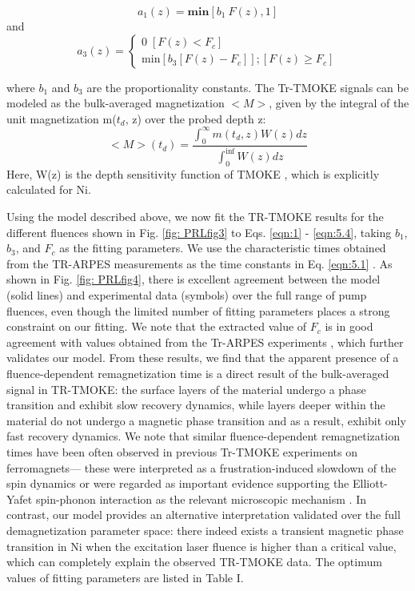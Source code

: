 \begin{equation}
a_1(z) = \textbf{min}[b_1 \: F(z),1]
\label{eqn:5.2}
\end{equation}
and
\begin{equation*}
a_3(z) = 
\begin{cases}
0 \; \left[F(z) < F_c\right]\\
\text{min} \left[ b_3 \left[ F(z)-F_c \right] \right]; \left[F(z) \geq F_c\right]
\end{cases}
\label{eqn:5.3}
\end{equation*}

where $b_1$ and $b_3$ are the proportionality constants. The Tr-TMOKE signals can be modeled as the bulk-averaged magnetization $<M>$, given by the integral of the unit magnetization m($t_d$, z) over the probed depth z:
\begin{equation}
<M>(t_d)=\frac{\int^{\infty}_0 m(t_d,z) W(z) dz}{\int^{\inf}_0 W(z) dz}
\label{eqn:4}
\end{equation}
Here, W(z) is the depth sensitivity function of TMOKE \cite{TraegerG.WenzelL.Hubert1992}, which is explicitly calculated for Ni.

Using the model described above, we now fit the TR-TMOKE results for the different fluences shown in Fig. \ref{fig: PRLfig3} to Eqs. \ref{eqn:1} - \ref{eqn:5.4}, taking $b_1$, $b_3$, and $F_c$ as the fitting parameters. We use the characteristic times obtained from the TR-ARPES measurements as the time constants in Eq. \ref{eqn:5.1} . As shown in Fig. \ref{fig: PRLfig4}, there is excellent agreement between the model (solid lines) and experimental data (symbols) over the full range of pump fluences, even though the limited number of fitting parameters places a strong constraint on our fitting. We note that the extracted value of $F_c$ is in good agreement with values obtained from the Tr-ARPES experiments \cite{Tengdin2018}, which further validates our model. From these results, we find that the apparent presence of a fluence-dependent remagnetization time is a direct result of the bulk-averaged signal in TR-TMOKE: the surface layers of the material undergo a phase transition and exhibit slow recovery dynamics, while layers deeper within the material do not undergo a magnetic phase transition and as a result, exhibit only fast recovery dynamics. We note that similar fluence-dependent remagnetization times have been often observed in previous Tr-TMOKE experiments on ferromagnets— these were interpreted as a frustration-induced slowdown of the spin dynamics \cite{Kazantseva2008} or were regarded as important evidence supporting the Elliott-Yafet spin-phonon interaction as the relevant microscopic mechanism \cite{Roth2012,Koopmans2010}. In contrast, our model provides an alternative interpretation validated over the full demagnetization parameter space: there indeed exists a transient magnetic phase transition in Ni when the excitation laser fluence is higher than a critical value, which can completely explain the observed TR-TMOKE data. The optimum values of fitting parameters are listed in Table I.

